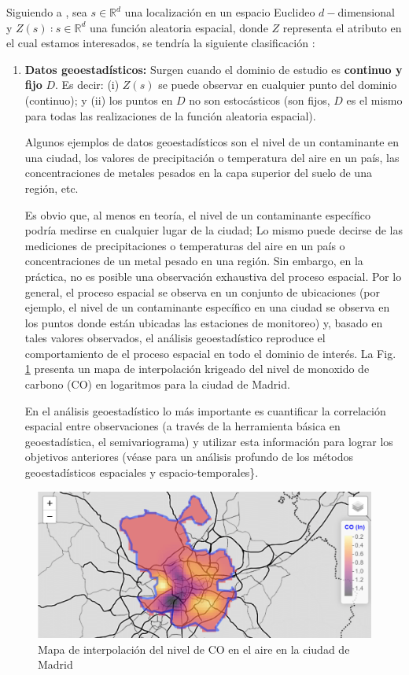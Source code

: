 \documentclass[
]{report}
\theoremstyle{definition}
\theoremstyle{definition}
\theoremstyle{definition}
\theoremstyle{definition}
\theoremstyle{remark}
\begin{document}
Siguiendo a \citet{cressie1993}, sea \(s ∈ ℝ^d\) una localización en un espacio Euclideo
\(d-\)dimensional y \({Z(s)∶ s ∈ ℝ^d}\) una función aleatoria espacial, donde \(Z\)
representa el atributo en el cual estamos interesados, se tendría la siguiente
clasificación \citep{montero_et_al_2015}:

\begin{enumerate}
\def\labelenumi{\arabic{enumi}.}
\item
  \textbf{Datos geoestadísticos:} Surgen cuando el dominio de estudio es \textbf{continuo
  y fijo} \(D\). Es decir: (i) \(Z(s)\) se puede observar en cualquier punto del
  dominio (continuo); y (ii) los puntos en \(D\) no son estocásticos (son fijos,
  \(D\) es el mismo para todas las realizaciones de la función aleatoria
  espacial).

  Algunos ejemplos de datos geoestadísticos son el nivel de un contaminante en
  una ciudad, los valores de precipitación o temperatura del aire en un país,
  las concentraciones de metales pesados en la capa superior del suelo de una
  región, etc.

  Es obvio que, al menos en teoría, el nivel de un contaminante específico
  podría medirse en cualquier lugar de la ciudad; Lo mismo puede decirse de
  las mediciones de precipitaciones o temperaturas del aire en un país o
  concentraciones de un metal pesado en una región. Sin embargo, en la
  práctica, no es posible una observación exhaustiva del proceso espacial. Por
  lo general, el proceso espacial se observa en un conjunto de ubicaciones
  (por ejemplo, el nivel de un contaminante específico en una ciudad se
  observa en los puntos donde están ubicadas las estaciones de monitoreo) y,
  basado en tales valores observados, el análisis geoestadístico reproduce el
  comportamiento de el proceso espacial en todo el dominio de interés. La Fig.
  \ref{fig:ejem-geo} presenta un mapa de interpolación krigeado del nivel de
  monoxido de carbono (CO) en logaritmos para la ciudad de Madrid.

  En el análisis geoestadístico lo más importante es cuantificar la
  correlación espacial entre observaciones (a través de la herramienta básica
  en geoestadística, el semivariograma) y utilizar esta información para
  lograr los objetivos anteriores (véase \citet{montero_et_al_2015} para un análisis
  profundo de los métodos geoestadísticos espaciales y espacio-temporales\}.
\end{enumerate}

\begin{figure}

{\centering \includegraphics[width=0.6\linewidth]{img/log_co_madrid} 

}

\caption{Mapa de interpolación del nivel de CO en el aire en la ciudad de Madrid}\label{fig:ejem-geo}
\end{figure}
\end{document}
